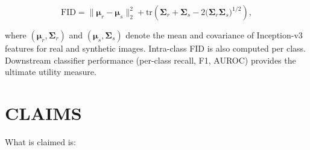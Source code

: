\documentclass[12pt,letterpaper]{article}
\newcommand{\bmu}{\bm{\mu}}
\begin{document}
\begin{equation}
  \text{FID} = \|\bmu_r - \bmu_s\|_2^2
    + \text{tr}\!\left(\bm{\Sigma}_r + \bm{\Sigma}_s
      - 2\bigl(\bm{\Sigma}_r \bm{\Sigma}_s\bigr)^{1/2}\right),
  \label{eq:fid}
\end{equation}

where $(\bmu_r, \bm{\Sigma}_r)$ and $(\bmu_s, \bm{\Sigma}_s)$ denote the
mean and covariance of Inception-v3 features for real and synthetic images.
Intra-class FID is also computed per class.  Downstream classifier
performance (per-class recall, F1, AUROC) provides the ultimate utility
measure.

\newpage
\section*{CLAIMS}

What is claimed is:
\end{document}
